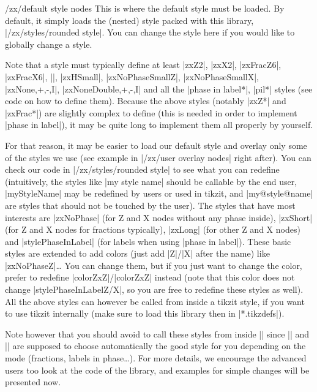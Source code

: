\documentclass[a4paper]{ltxdoc}
\begin{document}
\begin{stylekey}{/zx/default style nodes}
  This is where the default style must be loaded. By default, it simply loads the (nested) style packed with this library, |/zx/styles/rounded style|. You can change the style here if you would like to globally change a style.

  Note that a style must typically define at least |zxZ2|, |zxX2|, |zxFracZ6|, |zxFracX6|, |\zxH|, |zxHSmall|, |zxNoPhaseSmallZ|, |zxNoPhaseSmallX|, |zxNone{,+,-,I}|, |zxNoneDouble{,+,-,I}| and all the |phase in label*|, |pil*| styles (see code on how to define them). Because the above styles (notably |zxZ*| and |zxFrac*|) are slightly complex to define (this is needed in order to implement |phase in label|), it may be quite long to implement them all properly by yourself.

  For that reason, it may be easier to load our default style and overlay only some of the styles we use (see example in |/zx/user overlay nodes| right after). You can check our code in |/zx/styles/rounded style| to see what you can redefine (intuitively, the styles like |my style name| should be callable by the end user, |myStyleName| may be redefined by users or used in tikzit, and |my@style@name| are styles that should not be touched by the user). The styles that have most interests are |zxNoPhase| (for Z and X nodes without any phase inside), |zxShort| (for Z and X nodes for fractions typically), |zxLong| (for other Z and X nodes) and |stylePhaseInLabel| (for labels when using |phase in label|). These basic styles are extended to add colors (just add |Z|/|X| after the name) like |zxNoPhaseZ|\dots{} You can change them, but if you just want to change the color, prefer to redefine |colorZxZ|/|colorZxZ| instead (note that this color does not change |stylePhaseInLabelZ/X|, so you are free to redefine these styles as well). All the above styles can however be called from inside a tikzit style, if you want to use tikzit internally (make sure to load this library then in |*.tikzdefs|).

  Note however that you should avoid to call these styles from inside || since |\zx*| and |\zxFrac*| are supposed to choose automatically the good style for you depending on the mode (fractions, labels in phase\dots{}). For more details, we encourage the advanced users too look at the code of the library, and examples for simple changes will be presented now.
\end{stylekey}
\end{document}
